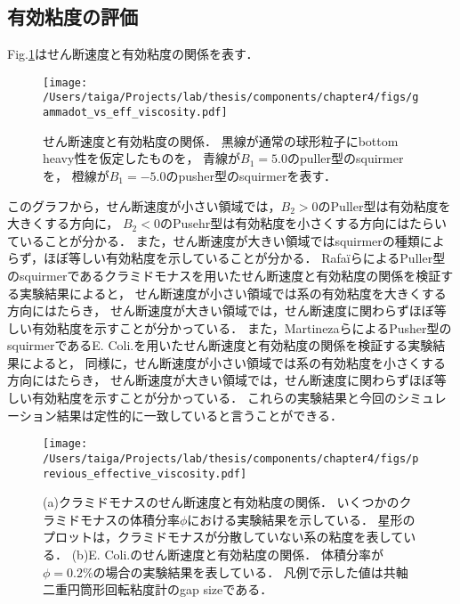 \subsection{有効粘度の評価}
Fig.\ref{fig:estimate_eff_viscocity}はせん断速度と有効粘度の関係を表す．

    \begin{figure}[H]
        \centering
        \texttt{[image: /Users/taiga/Projects/lab/thesis/components/chapter4/figs/gammadot\_vs\_eff\_viscosity.pdf]}
        \caption{せん断速度と有効粘度の関係．
        黒線が通常の球形粒子にbottom heavy性を仮定したものを，
        青線が$B_1 = 5.0$のpuller型のsquirmerを，
        橙線が$B_1 = -5.0$のpusher型のsquirmerを表す．}
        \label{fig:estimate_eff_viscocity}
    \end{figure}

\noindent
このグラフから，せん断速度が小さい領域では，$B_2 > 0$のPuller型は有効粘度を大きくする方向に，
$B_2 < 0$のPusehr型は有効粘度を小さくする方向にはたらいていることが分かる．
また，せん断速度が大きい領域ではsquirmerの種類によらず，ほぼ等しい有効粘度を示していることが分かる．
Rafa\"iらによるPuller型のsquirmerであるクラミドモナスを用いたせん断速度と有効粘度の関係を検証する実験結果によると，
せん断速度が小さい領域では系の有効粘度を大きくする方向にはたらき，
せん断速度が大きい領域では，せん断速度に関わらずほぼ等しい有効粘度を示すことが分かっている\cite{effective_viscosity}．
また，MartinezaらによるPusher型のsquirmerであるE. Coli.を用いたせん断速度と有効粘度の関係を検証する実験結果によると，
同様に，せん断速度が小さい領域では系の有効粘度を小さくする方向にはたらき，
せん断速度が大きい領域では，せん断速度に関わらずほぼ等しい有効粘度を示すことが分かっている\cite{e_coli_experiment}．
これらの実験結果と今回のシミュレーション結果は定性的に一致していると言うことができる．

    \begin{figure}[htbp]
        \centering
        \texttt{[image: /Users/taiga/Projects/lab/thesis/components/chapter4/figs/previous\_effective\_viscosity.pdf]}
        \caption{(a)クラミドモナスのせん断速度と有効粘度の関係\cite{effective_viscosity}．
        いくつかのクラミドモナスの体積分率$\phi$における実験結果を示している．
        星形のプロットは，クラミドモナスが分散していない系の粘度を表している．
        (b)E. Coli.のせん断速度と有効粘度の関係\cite{e_coli_experiment}．
        体積分率が$\phi = 0.2 \%$の場合の実験結果を表している．
        凡例で示した値は共軸二重円筒形回転粘度計のgap sizeである．}
    \end{figure}
